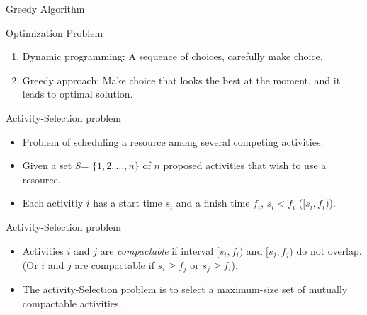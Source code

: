 \documentclass{beamer}
\begin{document}
\begin{frame}{}
\begin{center}
{\Large Greedy Algorithm}
\end{center}
\begin{center}
Optimization Problem
\end{center}
\begin{enumerate}
\item Dynamic programming: A sequence of choices, carefully make choice.  
\item Greedy approach: Make choice that looks the best at the moment, and
 it leads to optimal solution.  
\end{enumerate}
\end{frame}
\begin{frame}{}
\begin{center}
{\large Activity-Selection problem}
\end{center}
\begin{itemize}
\item Problem of scheduling a resource among several competing activities.
\item Given a set $S$= $\{1,2,\ldots,n\}$ of $n$ proposed activities that wish
 to use a resource.
\item Each activitiy $i$ has a start time $s_i$ and a finish time $f_i$,
 $s_i<f_i$ ($[s_i,f_i)$).
\end{itemize}
\end{frame}

\begin{frame}{}
\begin{center}
{\large Activity-Selection problem}
\end{center}
\begin{itemize}  
\item Activities $i$ and $j$ are {\it compactable} if interval $[s_i,f_i)$
 and $[s_j,f_j)$ do not overlap.  (Or $i$ and $j$ are compactable if
 $s_i\ge f_j$ or $s_j\ge f_i$).
\item The activity-Selection problem is to select
 a maximum-size set of mutually
 compactable activities.  
\end{itemize}
\end{frame}
\end{document}
